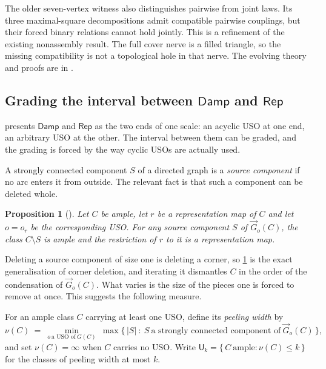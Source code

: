 \documentclass[11pt]{article}
\newtheorem{proposition}{Proposition}[section]
\theoremstyle{definition}
\newcommand{\Damp}{\mathsf{Damp}}
\newcommand{\Rep}{\mathsf{Rep}}
\begin{document}
The older seven-vertex witness also distinguishes pairwise from joint laws.
Its three maximal-square decompositions admit compatible pairwise couplings,
but their forced binary relations cannot hold jointly. This is a refinement
of the existing nonassembly result. The full cover nerve is a filled triangle,
so the missing compatibility is not a topological hole in that nerve.
The evolving theory and proofs are in
\cite[Section~\textnormal{Cubical allocations as a theory of probability
models}]{AlgebraicAmple}.

\subsection{Grading the interval between \texorpdfstring{$\Damp$}{Damp} and
\texorpdfstring{$\Rep$}{Rep}}\label{sec:uso-width}

 presents $\Damp$ and $\Rep$ as the two ends of one
scale: an acyclic USO at one end, an arbitrary USO at the other. The interval
between them can be graded, and the grading is forced by the way cyclic USOs are
actually used.

A strongly connected component $S$ of a directed graph is a \emph{source
component} if no arc enters it from outside. The relevant fact is that such a
component can be deleted whole.

\begin{proposition}[{\cite[Proposition~A.2]{CCMW}}]\label{prop:source-component}
Let $C$ be ample, let $r$ be a representation map of $C$ and let $o=o_{r}$ be the
corresponding USO. For any source component $S$ of $\overrightarrow{G}_{o}(C)$,
the class $C\setminus S$ is ample and the restriction of $r$ to it is a
representation map.
\end{proposition}

Deleting a source component of size one is deleting a corner, so
\cref{prop:source-component} is the exact generalisation of corner deletion, and
iterating it dismantles $C$ in the order of the condensation of
$\overrightarrow{G}_{o}(C)$. What varies is the size of the pieces one is forced
to remove at once. This suggests the following measure.

For an ample class $C$ carrying at least one USO, define its \emph{peeling
width} by
\begin{equation}\label{eq:peeling-width}
  \nu(C)\ =\ \min_{o\ \text{a USO of}\ G(C)}\ \max\{\,|S|\ :\ S\ \text{a
  strongly connected component of}\ \overrightarrow{G}_{o}(C)\,\},
\end{equation}
and set $\nu(C)=\infty$ when $C$ carries no USO. Write
$\mathsf{U}_{k}=\{\,C\ \text{ample}:\nu(C)\le k\,\}$ for the classes of
peeling width at most $k$.
\end{document}
